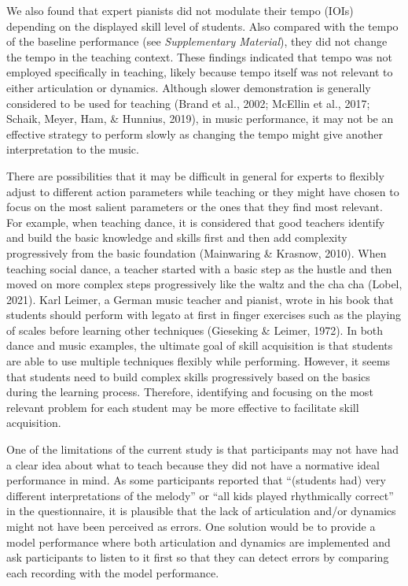 \documentclass[
  man,floatsintext]{apa6}
\begin{document}
We also found that expert pianists did not modulate their tempo (IOIs) depending on the displayed skill level of students. Also compared with the tempo of the baseline performance (see \emph{Supplementary Material}), they did not change the tempo in the teaching context. These findings indicated that tempo was not employed specifically in teaching, likely because tempo itself was not relevant to either articulation or dynamics. Although slower demonstration is generally considered to be used for teaching (Brand et al., 2002; McEllin et al., 2017; Schaik, Meyer, Ham, \& Hunnius, 2019), in music performance, it may not be an effective strategy to perform slowly as changing the tempo might give another interpretation to the music.

There are possibilities that it may be difficult in general for experts to flexibly adjust to different action parameters while teaching or they might have chosen to focus on the most salient parameters or the ones that they find most relevant. For example, when teaching dance, it is considered that good teachers identify and build the basic knowledge and skills first and then add complexity progressively from the basic foundation (Mainwaring \& Krasnow, 2010). When teaching social dance, a teacher started with a basic step as the hustle and then moved on more complex steps progressively like the waltz and the cha cha (Lobel, 2021). Karl Leimer, a German music teacher and pianist, wrote in his book that students should perform with legato at first in finger exercises such as the playing of scales before learning other techniques (Gieseking \& Leimer, 1972). In both dance and music examples, the ultimate goal of skill acquisition is that students are able to use multiple techniques flexibly while performing. However, it seems that students need to build complex skills progressively based on the basics during the learning process. Therefore, identifying and focusing on the most relevant problem for each student may be more effective to facilitate skill acquisition.

One of the limitations of the current study is that participants may not have had a clear idea about what to teach because they did not have a normative ideal performance in mind. As some participants reported that ``(students had) very different interpretations of the melody'' or ``all kids played rhythmically correct'' in the questionnaire, it is plausible that the lack of articulation and/or dynamics might not have been perceived as errors. One solution would be to provide a model performance where both articulation and dynamics are implemented and ask participants to listen to it first so that they can detect errors by comparing each recording with the model performance.
\end{document}
